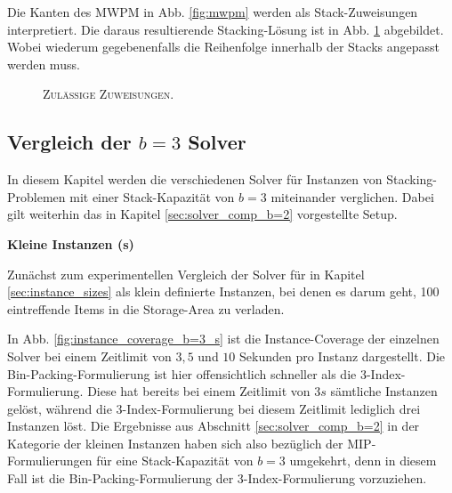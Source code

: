 \pagebreak

Die Kanten des \textsc{MWPM} in Abb. \ref{fig:mwpm} werden als Stack-Zuweisungen interpretiert.
Die daraus resultierende Stacking-Lösung ist in Abb. \ref{fig:valid_solution} abgebildet. Wobei wiederum gegebenenfalls die Reihenfolge
innerhalb der Stacks angepasst werden muss.

\begin{figure}[H]
  \centering
    \caption{\textsc{Zulässige Zuweisungen.}}
    \label{fig:valid_solution}
\end{figure}

\subsection{Vergleich der $b = 3$ Solver}
\label{sec:solver_comp_b=3}

In diesem Kapitel werden die verschiedenen Solver für Instanzen von Stacking-Problemen mit einer Stack-Kapazität
von $b = 3$ miteinander verglichen. Dabei gilt weiterhin das in Kapitel \ref{sec:solver_comp_b=2} vorgestellte Setup.

\textbf{Kleine Instanzen (s)}

Zunächst zum experimentellen Vergleich der Solver für in Kapitel \ref{sec:instance_sizes} als klein definierte
Instanzen, bei denen es darum geht, 100 eintreffende Items in die Storage-Area zu verladen.

In Abb. \ref{fig:instance_coverage_b=3_s} ist die Instance-Coverage der einzelnen Solver bei einem Zeitlimit von $3, 5$
und $10$ Sekunden pro Instanz dargestellt. Die Bin-Packing-Formulierung ist hier offensichtlich schneller als die 3-Index-Formulierung.
Diese hat bereits bei einem Zeitlimit von $3s$ sämtliche Instanzen gelöst, während die 3-Index-Formulierung
bei diesem Zeitlimit lediglich drei Instanzen löst. Die Ergebnisse aus Abschnitt \ref{sec:solver_comp_b=2} in der Kategorie der kleinen
Instanzen haben sich also bezüglich der MIP-Formulierungen für eine Stack-Kapazität von $b = 3$ umgekehrt, denn in diesem Fall
ist die Bin-Packing-Formulierung der 3-Index-Formulierung vorzuziehen.

